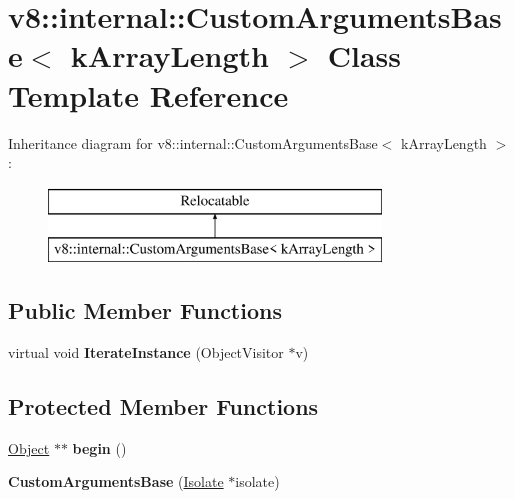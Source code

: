 \hypertarget{classv8_1_1internal_1_1_custom_arguments_base}{}\section{v8\+:\+:internal\+:\+:Custom\+Arguments\+Base$<$ k\+Array\+Length $>$ Class Template Reference}
\label{classv8_1_1internal_1_1_custom_arguments_base}
Inheritance diagram for v8\+:\+:internal\+:\+:Custom\+Arguments\+Base$<$ k\+Array\+Length $>$\+:\begin{figure}[H]
\begin{center}
\leavevmode
\includegraphics[height=2.000000cm]{classv8_1_1internal_1_1_custom_arguments_base}
\end{center}
\end{figure}
\subsection*{Public Member Functions}
\begin{DoxyCompactItemize}
\item 
\hypertarget{classv8_1_1internal_1_1_custom_arguments_base_a906d0eea154ca3abda0979512657c8d4}{}virtual void {\bfseries Iterate\+Instance} (Object\+Visitor $\ast$v)\label{classv8_1_1internal_1_1_custom_arguments_base_a906d0eea154ca3abda0979512657c8d4}

\end{DoxyCompactItemize}
\subsection*{Protected Member Functions}
\begin{DoxyCompactItemize}
\item 
\hypertarget{classv8_1_1internal_1_1_custom_arguments_base_a98ea9f40f92ccb6ce53a96f1e919a622}{}\hyperlink{classv8_1_1internal_1_1_object}{Object} $\ast$$\ast$ {\bfseries begin} ()\label{classv8_1_1internal_1_1_custom_arguments_base_a98ea9f40f92ccb6ce53a96f1e919a622}

\item 
\hypertarget{classv8_1_1internal_1_1_custom_arguments_base_a9ecca64feb2b74edd6d49116ea6f46b5}{}{\bfseries Custom\+Arguments\+Base} (\hyperlink{classv8_1_1internal_1_1_isolate}{Isolate} $\ast$isolate)\label{classv8_1_1internal_1_1_custom_arguments_base_a9ecca64feb2b74edd6d49116ea6f46b5}

\end{DoxyCompactItemize}
